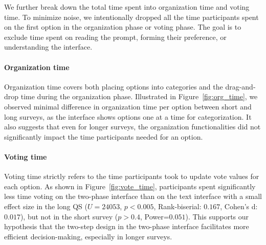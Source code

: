 We further break down the total time spent into organization time and voting time. To minimize noise, we intentionally dropped all the time participants spent on the first option in the organization phase or voting phase. The goal is to exclude time spent on reading the prompt, forming their preference, or understanding the interface.

\paragraph{Organization time} Organization time covers both placing options into categories and the drag-and-drop time during the organization phase. Illustrated in Figure~\ref{fig:org_time}, we observed minimal difference in organization time per option between short and long surveys, as the interface shows options one at a time for categorization. It also suggests that even for longer surveys, the organization functionalities did not significantly impact the time participants needed for an option.

\paragraph{Voting time} Voting time strictly refers to the time participants took to update vote values for each option. As shown in Figure~\ref{fig:vote_time}, participants spent significantly less time voting on the two-phase interface than on the text interface with a small effect size in the long QS ($U=24053$, $p<0.005$, Rank-biserial: $0.167$, Cohen's d: $0.017$), but not in the short survey ($p>0.4$, Power=$0.051$). This supports our hypothesis that the two-step design in the two-phase interface facilitates more efficient decision-making, especially in longer surveys.

